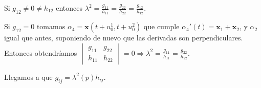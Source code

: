\documentclass[twoside]{article}
\newcommand{\x}{{\mathbf{x}}}
\begin{document}
\begin{solucion}
\begin{itemize}
Si $g_{12}\neq 0\neq h_{12}$ entonces $\lambda^2=\frac{g_{11}}{h_{11}}=\frac{g_{22}}{h_{22}}=\frac{g_{12}}{h_{12}}$. 

Si $g_{12}=0$ tomamos $\alpha_4=\x(t+u^1_0,t+u^2_0)$ que cumple $\alpha_4'(t)=\x_1+\x_2$, y $\alpha_2$ igual que antes, suponiendo de nuevo que las derivadas son perpendiculares. Entonces obtendríamos
$\begin{vmatrix}
g_{11} & g_{22}\\
h_{11} & h_{22}
\end{vmatrix}=0\Rightarrow \lambda^2=\frac{g_{11}}{h_{11}}=\frac{g_{22}}{h_{22}}$.

Llegamos a que $g_{ij}=λ^2(p)h_{ij}$.
\end{itemize}
\end{solucion}
\end{document}
